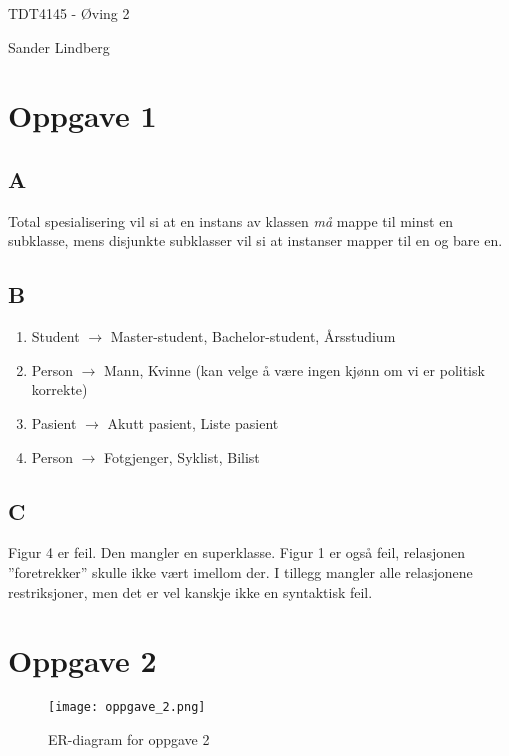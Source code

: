 \documentclass[12pt,a4paper]{article}
\begin{document}
\begin{titlepage}
    \centering
    \vspace*{\fill}

    \vspace*{0.5cm}

    \huge
    TDT4145 - Øving 2

    \vspace*{0.5cm}

    \large Sander Lindberg

    \vspace*{\fill}
    \end{titlepage}

	\newpage
	
	\section{Oppgave 1}
	\subsection{A}
		Total spesialisering vil si at en instans av klassen \textit{må} mappe til minst en subklasse, mens disjunkte subklasser vil si at instanser mapper til en og bare en.
		
	\subsection{B}
		\begin{enumerate}[i]
			\item Student $\rightarrow$ Master-student, Bachelor-student, Årsstudium
			\item Person $\rightarrow$ Mann, Kvinne (kan velge å være ingen kjønn om vi er politisk korrekte)
			\item Pasient $\rightarrow$ Akutt pasient, Liste pasient
			\item Person $\rightarrow$ Fotgjenger, Syklist, Bilist
		\end{enumerate}
		
	\subsection{C}
		Figur 4 er feil. Den mangler en superklasse. Figur 1 er også feil, relasjonen ''foretrekker'' skulle ikke vært imellom der. I tillegg mangler alle relasjonene restriksjoner, men det er vel kanskje ikke en syntaktisk feil.
		
	\section{Oppgave 2}
		\begin{figure}[!ht]
			\centering
			\texttt{[image: oppgave\_2.png]}
			\caption{ER-diagram for oppgave 2}
			\label{fig:oppgave_2}
		\end{figure}		
	
\end{document}

